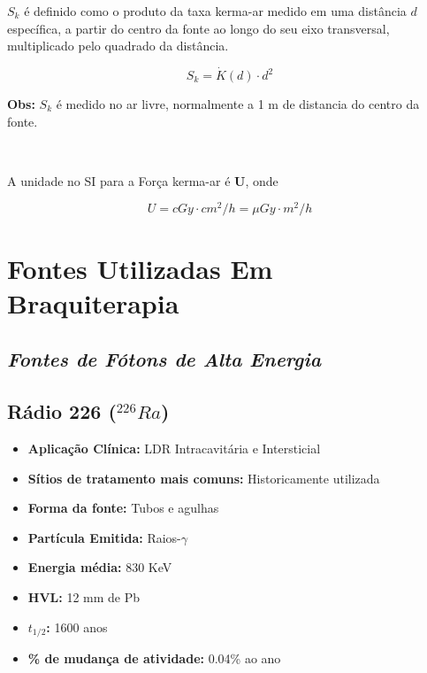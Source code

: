\documentclass[11pt,a4paper]{article}
\begin{document}
			$S_k$ é definido como o produto da taxa kerma-ar medido em uma distância $d$ específica, a partir do centro da fonte ao longo do seu eixo transversal, multiplicado pelo quadrado da distância.

			\begin{equation}
				S_k = \dot{K}(d) \cdot d^2
			\end{equation}

			\textbf{\textcolor{CarnationPink}{Obs:} } $S_k$ é medido no ar livre, normalmente a 1 m de distancia do centro da fonte.

			\

			A unidade no SI para a Força kerma-ar é \textbf{\textcolor{CarnationPink}{U}}, onde


			\begin{equation}
				U = cGy \cdot cm^2 / h = \mu Gy \cdot m^2 / h
			\end{equation}

	\section{Fontes Utilizadas Em Braquiterapia}

		\subsection*{\textbf{\textit{\textcolor{CarnationPink}{Fontes de  Fótons de Alta Energia}}}}

			
		\subsection{Rádio 226 \textbf{\textcolor{CarnationPink}{(${}^{226}Ra$)}}}\label{sec:radio226}
			
			
			\begin{itemize}
				\item \textbf{Aplicação Clínica:} LDR Intracavitária e Intersticial
				\item \textbf{Sítios de tratamento mais comuns:} Historicamente utilizada
				\item \textbf{Forma da fonte:} Tubos e agulhas
				\item \textbf{Partícula Emitida:} Raios-$\gamma$
				\item \textbf{Energia média: } 830 KeV
				\item \textbf{HVL:} 12 mm de Pb
				\item \textbf{$t_{1/2}$:} 1600 anos
				\item \textbf{\% de mudança de atividade: } 0.04\% ao ano
			\end{itemize}
			
\end{document}
